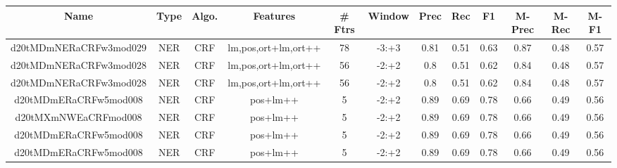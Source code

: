 \documentclass[a4paper]{article}
\begin{document}
\begin{landscape}
\begin{center}
\begin{tabular}{ |c|c|c|c|c|c|c|c|c|c|c|c|}
 \hline
\end{tabular}
\end{center}




\begin{center}
\begin{tabular}{ |c|c|c|c|c|c|c|c|c|c|c|c|} 
 \hline
 	Name & Type & Algo. & Features & \# Ftrs & Window & Prec & Rec & F1 & M-Prec & M-Rec & M-F1\\
 \hline

 		

 	
 
 	
 		
 		\small{ d20tMDmNERaCRFw3mod029 } & NER & CRF & lm,pos,ort+lm,ort++  &  78 &  -3:+3  &  0.81 & 0.51 & 0.63  &  0.87 & 0.48 & 0.57 \\
 		

 	
 
 	
 		
 		\small{ d20tMDmNERaCRFw3mod028 } & NER & CRF & lm,pos,ort+lm,ort++  &  56 &  -2:+2  &  0.8 & 0.51 & 0.62  &  0.84 & 0.48 & 0.57 \\
 		

 	
 
 	
 		
 		\small{ d20tMDmNERaCRFw3mod028 } & NER & CRF & lm,pos,ort+lm,ort++  &  56 &  -2:+2  &  0.8 & 0.51 & 0.62  &  0.84 & 0.48 & 0.57 \\
 		

 	
 
 	
 		
 		\small{ d20tMDmERaCRFw5mod008 } & NER & CRF & pos+lm++  &  5 &  -2:+2  &  0.89 & 0.69 & 0.78  &  0.66 & 0.49 & 0.56 \\
 		

 	
 
 	
 		
 		\small{ d20tMXmNWEaCRFmod008 } & NER & CRF & pos+lm++  &  5 &  -2:+2  &  0.89 & 0.69 & 0.78  &  0.66 & 0.49 & 0.56 \\
 		

 	
 
 	
 		
 		\small{ d20tMDmERaCRFw5mod008 } & NER & CRF & pos+lm++  &  5 &  -2:+2  &  0.89 & 0.69 & 0.78  &  0.66 & 0.49 & 0.56 \\
 		

 	
 
 	
 		
 		\small{ d20tMDmERaCRFw5mod008 } & NER & CRF & pos+lm++  &  5 &  -2:+2  &  0.89 & 0.69 & 0.78  &  0.66 & 0.49 & 0.56 \\
 		


\end{tabular}
\end{center}
\end{landscape}
\end{document}

